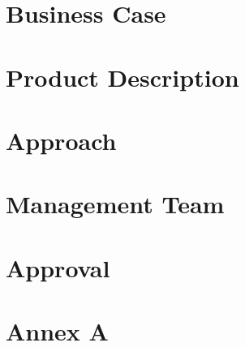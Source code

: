 \documentclass[letterpaper,10pt,openany,oneside,english]{sphinxmanual}
\begin{document}
\chapter{Business Case}
\label{\detokenize{business-case:business-case}}\label{\detokenize{business-case::doc}}

\chapter{Product Description}
\label{\detokenize{product-description:product-description}}\label{\detokenize{product-description::doc}}

\chapter{Approach}
\label{\detokenize{approach:approach}}\label{\detokenize{approach::doc}}

\chapter{Management Team}
\label{\detokenize{management-team:management-team}}\label{\detokenize{management-team::doc}}

\chapter{Approval}
\label{\detokenize{approval:approval}}\label{\detokenize{approval::doc}}

\chapter{Annex A}
\label{\detokenize{annex-a:annex-a}}\label{\detokenize{annex-a::doc}}

\chapter{}
\label{\detokenize{index:document-author-s}}



\renewcommand{\indexname}{Index}
\printindex
\end{document}
